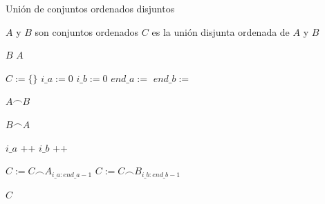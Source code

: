 \begin{algorithm}
\caption{Unión de conjuntos ordenados disjuntos}\label{alg:two}
\begin{algorithmic}[1]
\Require $A$ y $B$ son conjuntos ordenados
\Ensure $C$ es la unión disjunta ordenada de $A$ y $B$

    \State \Return $B$
\EndIf
{}
    \State \Return $A$
\EndIf

\State $C  := \{\}$
\State $i\_a  := 0$
\State $i\_b  := 0$
\State $end\_a :=$ 
\State $end\_b :=$ 


    \State \Return $A \frown B$
\EndIf

    \State \Return $B \frown A$
\EndIf

    \State {}
    \State $i\_a$ \!+\!+
  \Else 
    \State {}
    \State $i\_b$ \!+\!+
  \EndIf   
\EndFor


\State $C := C \frown A_{i\_a:end\_a - 1}$
\State $C := C \frown B_{i\_b:end\_b - 1}$

\State \Return $C$
\EndFunction
\end{algorithmic}
\end{algorithm}

\newpage

